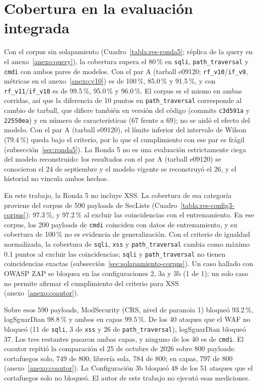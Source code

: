 \section{Cobertura en la evaluación integrada}

Con el corpus sin solapamiento (Cuadro~\ref{tabla:res-ronda5}; réplica de la query en el anexo~\ref{anexo:query}), la cobertura supera el 80\,\% en \texttt{sqli}, \texttt{path\_traversal} y \texttt{cmdi} con ambos pares de modelos. Con el par A (tarball e09120\textellipsis{}; \texttt{rf\_v10}/\texttt{if\_v9}, métricas en el anexo~\ref{anexo:v10}) es de 100\,\%, 85.0\,\% y 91.5\,\%, y con \texttt{rf\_v11}/\texttt{if\_v10} es de 99.5\,\%, 95.0\,\% y 96.0\,\%. El corpus es el mismo en ambas corridas, así que la diferencia de 10 puntos en \texttt{path\_traversal} corresponde al cambio de tarball, que difiere también en versión del código (commits \texttt{c3d591a} y \texttt{22550ea}) y en número de características (67 frente a 69); no se aisló el efecto del modelo. Con el par A (tarball e09120\textellipsis{}), el límite inferior del intervalo de Wilson (79.4\,\%) queda bajo el criterio, por lo que el cumplimiento con ese par es frágil (subsección~\ref{sec:ronda5}). La Ronda 5 no es una evaluación estrictamente ciega del modelo reconstruido: los resultados con el par A (tarball e09120\textellipsis{}) se conocieron el 24 de septiembre y el modelo vigente se reconstruyó el 26, y el historial no vincula ambos hechos.

En este trabajo, la Ronda 5 no incluye XSS. La cobertura de esa categoría proviene del corpus de 590 payloads de SecLists (Cuadro~\ref{tabla:res-config3-corpus}): 97.3\,\%, y 97.2\,\% al excluir las coincidencias con el entrenamiento. En ese corpus, los 200 payloads de \texttt{cmdi} coinciden con datos de entrenamiento, y su cobertura de 100\,\% no es evidencia de generalización. Con el criterio de igualdad normalizada, la cobertura de \texttt{sqli}, \texttt{xss} y \texttt{path\_traversal} cambia como máximo 0.1 puntos al excluir las coincidencias; \texttt{sqli} y \texttt{path\_traversal} no tienen coincidencias exactas (subsección~\ref{sec:solapamiento-corpus}). Un caso hallado con OWASP ZAP\parencite{zap} se bloquea en las configuraciones 2, 3a y 3b (1 de 1); un solo caso no permite afirmar el cumplimiento del criterio para XSS (anexo~\ref{anexo:coautor}).

Sobre esos 590 payloads, ModSecurity (CRS, nivel de paranoia 1) bloqueó 93.2\,\%, logSguarDian 98.8\,\% y ambos en capas 99.5\,\%. De los 40 ataques que el WAF no bloqueó (11 de \texttt{sqli}, 3 de \texttt{xss} y 26 de \texttt{path\_traversal}), logSguarDian bloqueó 37. Los tres restantes pasaron ambas capas, y ninguno de los 40 es de \texttt{cmdi}. El coautor repitió la comparación el 25 de octubre de 2026 sobre 800 payloads: cortafuegos solo, 749 de 800; librería sola, 784 de 800; en capas, 797 de 800 (anexo~\ref{anexo:coautor}). La Configuración 3b bloqueó 48 de los 51 ataques que el cortafuegos solo no bloqueó. El autor de este trabajo no ejecutó esas mediciones.

